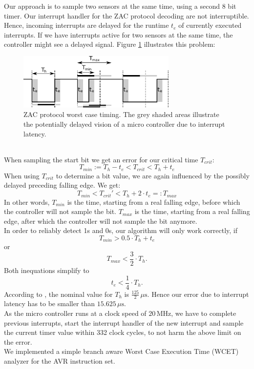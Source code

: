 \documentclass[a4paper]{scrreprt}
\begin{document}
Our approach is to sample two sensors at the
same time, using a second 8 bit timer. Our interrupt handler for the ZAC protocol decoding are not interruptible.
Hence, incoming interrupts are delayed for the runtime $t_e$ of currently executed interrupts.
If we have interrupts active for two sensors at the same time, the controller might see a delayed signal.
Figure \ref{fig:zactiming} illustrates this problem:
\begin{figure}[Hh!]
	\centering
	\includegraphics[width=0.7\textwidth]{img/zac_timing.pdf}
	\caption{ZAC protocol worst case timing. The grey shaded areas illustrate the potentially delayed vision
	of a micro controller due to interrupt latency.}
	\label{fig:zactiming}
\end{figure}
\\
When sampling the start bit we get an error for our critical time $T_{crit}$:
$$T_{min} := T_h - t_e < T_{crit} < T_h + t_e$$
When using $T_{crit}$ to determine a bit value, we are again influenced by the possibly delayed preceding falling edge. We get:
$$T_{min} < T_{crit}' < T_h + 2 \cdot t_e =: T_{max}$$
In other words, $T_{min}$ is the time, starting from a real falling edge,
before which the controller will not sample the bit. $T_{max}$ is the time,
starting from a real falling edge, after which the controller will not sample
the bit anymore.\\
In order to reliably detect 1s and 0s, our algorithm will only work correctly, if
$$T_{min} > 0.5\cdot T_h + t_e$$
or
$$T_{max} < \frac{3}{2}\cdot T_h\text{.}$$
Both inequations simplify to
$$t_e < \frac{1}{4}\cdot T_h\text{.}$$
According to \cite{zac}, the nominal value for $T_h$ is $\frac{125}{2}\,\mu\mathrm{s}$. Hence our error due to
interrupt latency has to be smaller than $15.625\,\mu\mathrm{s}$.\\
As the micro controller runs at a clock speed of $20\,\mathrm{MHz}$, we have to complete previous interrupts,
start the interrupt handler of the new interrupt and sample the current timer value within 332 clock cycles,
to not harm the above limit on the error.\\
We implemented a simple branch aware Worst Case Execution Time (WCET) analyzer for the AVR instruction set.
\end{document}
